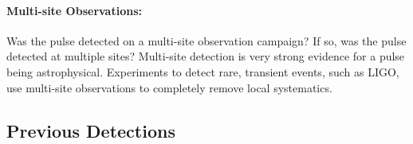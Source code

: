 \documentclass[a4paper,fleqn,usenatbib]{mnras}
\begin{document}
\paragraph{Multi-site Observations:}

Was the pulse detected on a multi-site observation campaign? If so, was the
pulse detected at multiple sites? Multi-site detection is very strong evidence
for a pulse being astrophysical. Experiments to detect rare, transient events,
such as LIGO, use multi-site observations to completely remove local
systematics.

\subsection{Previous Detections}

\end{document}
